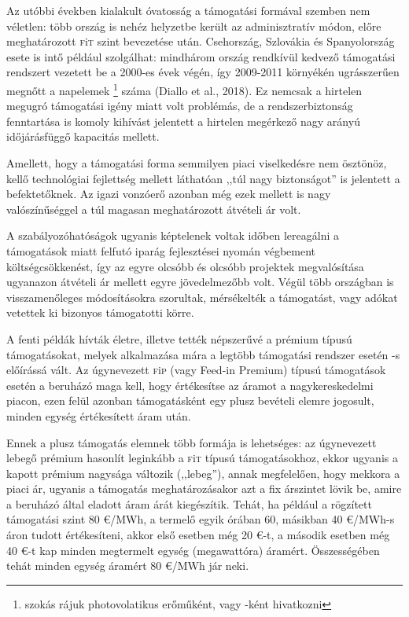 \documentclass[twoside, magyar, showtrims]{corvinusphd}
\newcommand{\fit}{\textsc{f}i\textsc{t}\index{\textsc{f}i\textsc{t}} }
\newcommand{\fip}{\textsc{f}i\textsc{p}\index{\textsc{f}i\textsc{p}} }
\begin{document}
Az utóbbi években kialakult óvatosság a
támogatási formával szemben nem véletlen:
több ország is nehéz helyzetbe került az
adminisztratív módon, előre meghatározott
\fit szint bevezetése után. Csehország, Szlovákia
és Spanyolország esete is intő például szolgálhat:
mindhárom ország rendkívül kedvező
támogatási rendszert
vezetett be a 2000-es évek végén, így 2009-2011 környékén ugrásszerűen
megnőtt a napelemek
\footnote{szokás rájuk photovolatikus erőműként, vagy -ként hivatkozni}
száma (Diallo et al., 2018).
Ez nemcsak a hirtelen megugró
támogatási igény miatt volt problémás,
de a rendszerbiztonság fenntartása
is komoly kihívást jelentett a hirtelen
megérkező nagy arányú időjárásfüggő kapacitás mellett.

Amellett, hogy a támogatási forma semmilyen
piaci viselkedésre nem ösztönöz, kellő technológiai
fejlettség mellett láthatóan ,,túl nagy biztonságot''
is jelentett a befektetőknek. Az igazi vonzóerő
azonban még ezek mellett is nagy valószínűséggel
a túl magasan meghatározott átvételi ár volt.

A szabályozóhatóságok ugyanis képtelenek voltak időben lereagálni
a támogatások miatt felfutó iparág fejlesztései nyomán végbement
költségcsökkenést, így az egyre olcsóbb és olcsóbb projektek megvalósítása
ugyanazon átvételi ár mellett egyre jövedelmezőbb volt.
Végül több országban is visszamenőleges módosításokra szorultak,
mérsékelték a támogatást, vagy adókat vetettek ki bizonyos támogatotti körre.

A fenti példák hívták életre, illetve tették
népszerűvé a prémium típusú támogatásokat,
melyek alkalmazása mára a legtöbb
támogatási rendszer esetén -s előírássá vált.
Az úgynevezett \fip (vagy Feed-in Premium)
típusú támogatások esetén a beruházó maga kell,
hogy értékesítse az áramot a nagykereskedelmi piacon,
ezen felül azonban támogatásként egy plusz bevételi elemre jogosult, 
minden egység értékesített áram után.

\label{FIP}
Ennek a plusz támogatás elemnek több formája is lehetséges:
az úgynevezett lebegő prémium hasonlít leginkább a \fit típusú
támogatásokhoz, ekkor ugyanis a kapott prémium nagysága változik (,,lebeg''),
annak megfelelően, hogy mekkora a piaci ár, ugyanis a támogatás
meghatározásakor azt a fix árszintet lövik be, amire a beruházó által
eladott áram árát kiegészítik. Tehát, ha például a rögzített támogatási szint
80 €/MWh, a termelő egyik órában 60, másikban 40 €/MWh-s áron
tudott értékesíteni, akkor első esetben még 20 €-t, a második esetben
még 40 €-t kap minden megtermelt egység (megawattóra) áramért.
Összességében tehát minden egység áramért 80 €/MWh jár neki.
\end{document}
